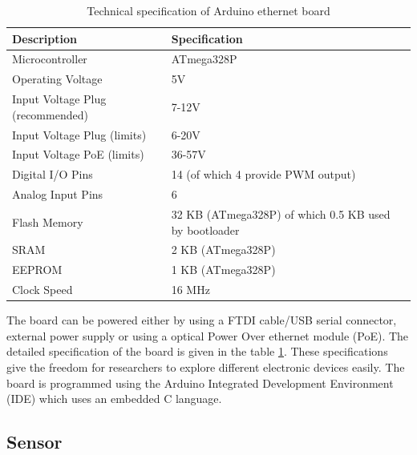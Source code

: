 \begin{table}[h]
  
 

  \begin{tabularx}{\columnwidth}{X|X}
      \hline
      Description                 & Specification    \\
      \hline
      Microcontroller & ATmega328P \\
      Operating Voltage & 5V\\
      Input Voltage Plug (recommended) & 7-12V\\
      Input Voltage Plug (limits)       & 6-20V\\
      Input Voltage PoE (limits)        & 36-57V \\
      Digital I/O Pins    & 14 (of which 4 provide PWM output)     \\
      Analog Input Pins & 6\\
      Flash Memory & 32 KB (ATmega328P) of which 0.5 KB used by bootloader\\
      SRAM     & 2 KB (ATmega328P)\\
      EEPROM   & 1 KB (ATmega328P) \\
      Clock Speed  & 16 MHz\\
      \hline
    
  \end{tabularx}
  \caption{Technical specification of Arduino ethernet board}
  \label{table:Technical specification}
\end{table}
 
The board can be powered either by using a FTDI cable/USB serial connector, external power supply or using a optical Power Over ethernet module (PoE). The detailed specification\cite{Guti2017} of the board is given in the table \ref{table:Technical specification}. These specifications give the freedom for researchers to explore different electronic devices easily. The board is programmed using the Arduino Integrated Development Environment (IDE) which uses an embedded C language.




\subsection{Sensor}


